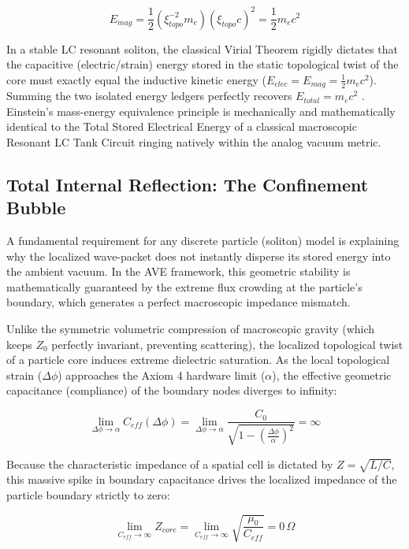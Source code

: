 \begin{equation}
E_{mag} = \frac{1}{2} (\xi_{topo}^{-2} m_e)(\xi_{topo} c)^2 = \frac{1}{2} m_e c^2
\end{equation}

In a stable LC resonant soliton, the classical Virial Theorem rigidly dictates that the
capacitive (electric/strain) energy stored in the static topological twist of the core must exactly
equal the inductive kinetic energy ($E_{elec} = E_{mag} = \frac{1}{2}m_e c^2$). Summing the two isolated energy
ledgers perfectly recovers $E_{total} = m_e c^2$ \cite{einstein1916}. Einstein's mass-energy equivalence principle is
mechanically and mathematically identical to the Total Stored Electrical Energy of a classical
macroscopic Resonant LC Tank Circuit ringing natively within the analog vacuum metric.

\subsection{Total Internal Reflection: The Confinement Bubble}

A fundamental requirement for any discrete particle (soliton) model is explaining why the
localized wave-packet does not instantly disperse its stored energy into the ambient vacuum.
In the AVE framework, this geometric stability is mathematically guaranteed by the extreme
flux crowding at the particle's boundary, which generates a perfect macroscopic impedance
mismatch.

Unlike the symmetric volumetric compression of macroscopic gravity (which keeps $Z_{0}$
perfectly invariant, preventing scattering), the localized topological twist of a particle core
induces extreme dielectric saturation. As the local topological strain ($\Delta\phi$) approaches the
Axiom 4 hardware limit ($\alpha$), the effective geometric capacitance (compliance) of the boundary
nodes diverges to infinity:

\begin{equation}
\lim_{\Delta\phi \to \alpha} C_{eff}(\Delta\phi) = \lim_{\Delta\phi \to \alpha} \frac{C_{0}}{\sqrt{1-\left(\frac{\Delta\phi}{\alpha}\right)^{2}}} = \infty
\end{equation}

Because the characteristic impedance of a spatial cell is dictated by $Z=\sqrt{L/C}$, this
massive spike in boundary capacitance drives the localized impedance of the particle boundary
strictly to zero:

\begin{equation}
\lim_{C_{eff} \to \infty} Z_{core} = \lim_{C_{eff} \to \infty} \sqrt{\frac{\mu_{0}}{C_{eff}}} = 0\,\Omega
\end{equation}


